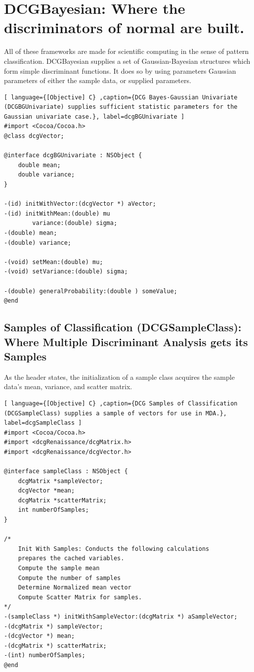 \documentclass[12pt]{report}
\begin{document}
\section{DCGBayesian: Where the discriminators of normal are built.}
All of these frameworks are made for scientific computing in the sense of pattern classification.  DCGBayesian supplies a set of Gaussian-Bayesian structures which form simple discriminant functions.  It does so by using parameters Gaussian parameters of either the sample data, or supplied parameters.  


\begin{lstlisting}[ language={[Objective] C} ,caption={DCG Bayes-Gaussian Univariate (DCGBGUnivariate) supplies sufficient statistic parameters for the Gaussian univariate case.}, label=dcgBGUnivariate ] 
#import <Cocoa/Cocoa.h>
@class dcgVector;

@interface dcgBGUnivariate : NSObject {
	double mean;
	double variance;
}

-(id) initWithVector:(dcgVector *) aVector;
-(id) initWithMean:(double) mu
		variance:(double) sigma;
-(double) mean;
-(double) variance;

-(void) setMean:(double) mu;
-(void) setVariance:(double) sigma;

-(double) generalProbability:(double ) someValue;
@end
\end{lstlisting}

\subsection{Samples of Classification (DCGSampleClass): Where Multiple Discriminant Analysis gets its Samples}
As the header states, the initialization of a sample class acquires the sample data's mean, variance, and scatter matrix.  

\begin{lstlisting}[ language={[Objective] C} ,caption={DCG Samples of Classification (DCGSampleClass) supplies a sample of vectors for use in MDA.}, label=dcgSampleClass ] 
#import <Cocoa/Cocoa.h>
#import <dcgRenaissance/dcgMatrix.h>
#import <dcgRenaissance/dcgVector.h>

@interface sampleClass : NSObject {
	dcgMatrix *sampleVector;
	dcgVector *mean;
	dcgMatrix *scatterMatrix;
	int numberOfSamples;
}

/*
	Init With Samples: Conducts the following calculations 
	prepares the cached variables.
	Compute the sample mean
	Compute the number of samples
	Determine Normalized mean vector
	Compute Scatter Matrix for samples.
*/
-(sampleClass *) initWithSampleVector:(dcgMatrix *) aSampleVector;
-(dcgMatrix *) sampleVector;
-(dcgVector *) mean;
-(dcgMatrix *) scatterMatrix;
-(int) numberOfSamples;
@end
\end{lstlisting}
\end{document}
